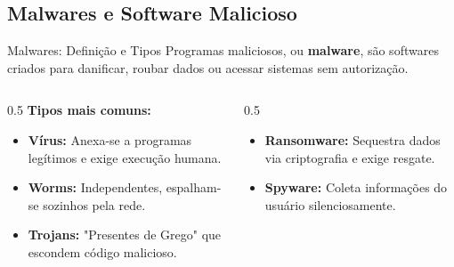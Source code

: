\documentclass[aspectratio=169]{beamer}
\begin{document}
\subsection{Malwares e Software Malicioso}

\begin{frame}{Malwares: Definição e Tipos}
    Programas maliciosos, ou \textbf{malware}, são softwares criados para danificar, roubar dados ou acessar sistemas sem autorização.
    \begin{columns}
        \begin{column}{0.5\textwidth}
            \textbf{Tipos mais comuns:}
            \begin{itemize}
                \item \textbf{Vírus:} Anexa-se a programas legítimos e exige execução humana.
                \item \textbf{Worms:} Independentes, espalham-se sozinhos pela rede.
                \item \textbf{Trojans:} "Presentes de Grego" que escondem código malicioso.
            \end{itemize}
        \end{column}
        \begin{column}{0.5\textwidth}
            \begin{itemize}
                \item \textbf{Ransomware:} Sequestra dados via criptografia e exige resgate.
                \item \textbf{Spyware:} Coleta informações do usuário silenciosamente.
            \end{itemize}
        \end{column}
    \end{columns}
\end{frame}
\end{document}
